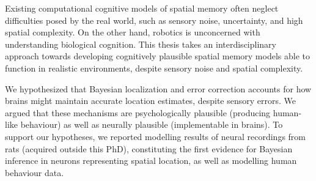 %
{
\singlespacing
{}


Existing computational cognitive models of spatial memory often neglect difficulties posed by the real world, such as sensory noise, uncertainty, and high spatial complexity. On the other hand, robotics is unconcerned with understanding biological cognition. This thesis takes an interdisciplinary approach towards developing cognitively plausible spatial memory models able to function in realistic environments, despite sensory noise and spatial complexity. 

We hypothesized that Bayesian localization and error correction accounts for how brains might maintain accurate location estimates, despite sensory errors. We argued that these mechanisms are psychologically plausible (producing human-like behaviour) as well as neurally plausible (implementable in brains). To support our hypotheses, we reported modelling results of neural recordings from rats (acquired outside this PhD), constituting the first evidence for Bayesian inference in neurons representing spatial location, as well as modelling human behaviour data. 




}
